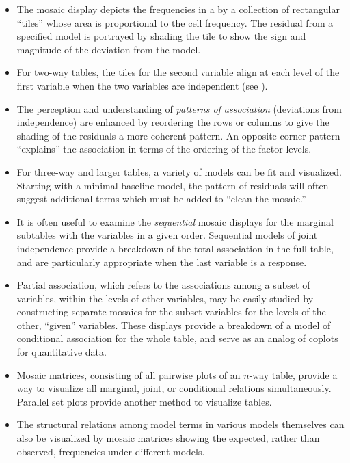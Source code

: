 \begin{itemize}
\item The mosaic display depicts the frequencies in a \ctab{} by a collection of rectangular ``tiles''
whose area is proportional to the cell frequency.
The residual from a specified model is portrayed by shading the tile
to show the sign and magnitude of the deviation from the model.

\item For two-way tables, the tiles for the second variable align
at each level of the first variable when the two variables are independent
(see ).

\item The perception and understanding of \emph{patterns of association}
(deviations from independence) are enhanced by reordering the
rows or columns to give the shading of the residuals a more
coherent pattern.  An opposite-corner pattern ``explains''
the association in terms of the ordering of the factor levels.

\item For three-way and larger tables, a variety of models can be fit
and visualized.
Starting with a minimal baseline model, the pattern of residuals
will often suggest additional terms which must be added to
``clean the mosaic.''

\item It is often useful to examine the \emph{sequential} mosaic
displays for the marginal subtables with the variables in a given order.
Sequential models of joint independence provide a breakdown of the
total association in the full table, and are particularly
appropriate when the last variable is a response.

\item Partial association, which refers to the associations among
a subset of variables, within the levels of other variables,
may be easily studied by constructing separate mosaics for the subset
variables for the levels of the other, ``given'' variables.
These displays provide a breakdown of a model of conditional association
for the whole table, and serve as an analog of coplots for quantitative
data.

\item Mosaic matrices, consisting of all pairwise plots of an $n$-way
table, provide a way to visualize all marginal, joint, or conditional 
relations simultaneously.  Parallel set plots provide another method
to visualize \nway tables.

\item The structural relations among model terms in various \loglin
models themselves can also be visualized by mosaic matrices
showing the expected, rather than observed, frequencies under different
models.
\end{itemize}

